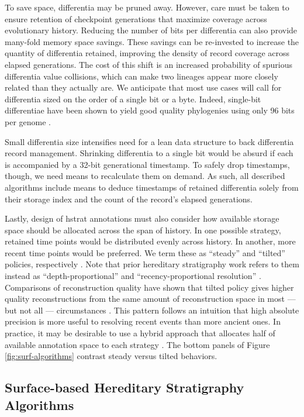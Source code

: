 To save space, differentia may be pruned away.
However, care must be taken to ensure retention of checkpoint generations that maximize coverage across evolutionary history.
Reducing the number of bits per differentia can also provide many-fold memory space savings.
These savings can be re-invested to increase the quantity of differentia retained, improving the density of record coverage across elapsed generations.
The cost of this shift is an increased probability of spurious differentia value collisions, which can make two lineages appear more closely related than they actually are.
We anticipate that most use cases will call for differentia sized on the order of a single bit or a byte.
Indeed, single-bit differentiae have been shown to yield good quality phylogenies using only 96 bits per genome \citep{moreno2024guide}.

Small differentia size intensifies need for a lean data structure to back differentia record management.
Shrinking differentia to a single bit would be absurd if each is accompanied by a 32-bit generational timestamp.
To safely drop timestamps, though, we need means to recalculate them on demand.
As such, all described algorithms include means to deduce timestamps of retained differentia solely from their storage index and the count of the record's elapsed generations.

Lastly, design of hstrat annotations must also consider how available storage space should be allocated across the span of history.
In one possible strategy, retained time points would be distributed evenly across history.
In another, more recent time points would be preferred.
We term these as ``steady'' and ``tilted'' policies, respectively \citep{han2005stream,zhao2005generalized}.
Note that prior hereditary stratigraphy work refers to them instead as ``depth-proportional'' and ``recency-proportional resolution'' \citep{moreno2022hereditary}.
Comparisons of reconstruction quality have shown that tilted policy gives higher quality reconstructions from the same amount of reconstruction space in most --- but not all --- circumstances \citep{moreno2024guide}.
This pattern follows an intuition that high absolute precision is more useful to resolving recent events than more ancient ones.
In practice, it may be desirable to use a hybrid approach that allocates half of available annotation space to each strategy \citep{moreno2024guide}.
The bottom panels of Figure \ref{fig:surf-algorithms} contrast steady versus tilted behaviors.

\subsection{Surface-based Hereditary Stratigraphy Algorithms}

